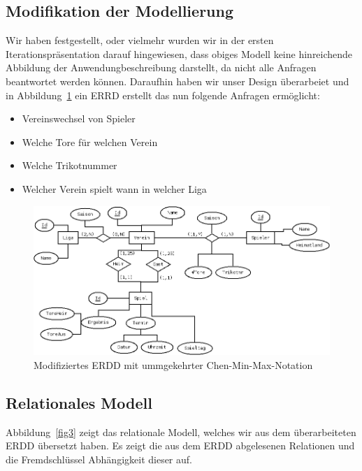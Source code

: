 \documentclass[
10pt,
a4paper
]{scrartcl}
\begin{document}
\subsection{Modifikation der Modellierung}

Wir haben festgestellt, oder vielmehr wurden wir in der ersten Iterationspräsentation darauf hingewiesen, dass obiges Modell keine hinreichende Abbildung der Anwendungbeschreibung darstellt, da nicht alle Anfragen beantwortet werden können. Daraufhin haben wir unser Design überarbeiet und in Abbildung~\ref{fig2} ein ERRD erstellt das nun folgende Anfragen ermöglicht:

 \begin{itemize}
  \item Vereinswechsel von Spieler
  \item Welche Tore für welchen Verein
  \item Welche Trikotnummer
  \item Welcher Verein spielt wann in welcher Liga
\end{itemize}

\begin{figure}[h]
	\centering
  \includegraphics[scale=0.4]{bundesliga.png}
	\caption{Modifiziertes ERDD mit ummgekehrter Chen-Min-Max-Notation}
	\label{fig2}
\end{figure}

\subsection{Relationales Modell }

Abbildung~\ref{fig3} zeigt das relationale Modell, welches wir aus dem überarbeiteten ERDD übersetzt haben. Es zeigt die aus dem ERDD abgelesenen Relationen und die Fremdschlüssel  Abhängigkeit dieser auf.
\end{document}
